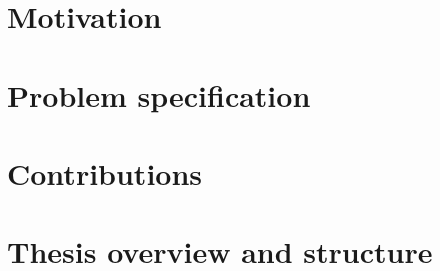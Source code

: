\section{Motivation}

\section{Problem specification}

\section{Contributions}

\section{Thesis overview and structure}
